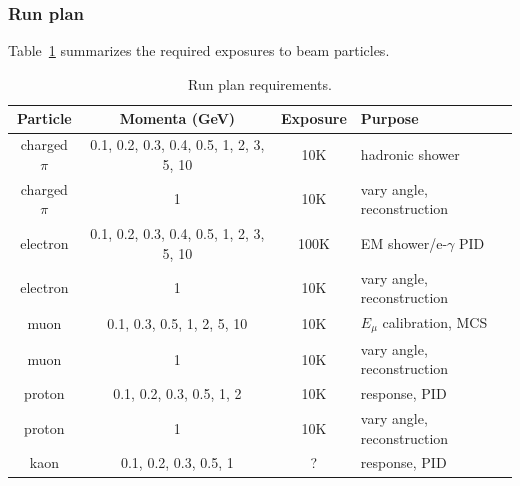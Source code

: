 \clearpage
\subsubsection {Run plan}

Table~\ref{tab:runplan} summarizes the required exposures to beam particles.
\begin{table}[h]
\centering
\begin{tabular}{|c|c|c|l|}
\hline
Particle & Momenta (GeV) & Exposure & Purpose \\ \hline
charged $\pi$       & 0.1, 0.2, 0.3, 0.4, 0.5, 1, 2, 3, 5, 10     &  10K  & hadronic shower \\ \hline
charged $\pi$ &  1  &  10K  & vary angle, reconstruction \\ \hline
electron       &    0.1, 0.2, 0.3, 0.4, 0.5, 1, 2, 3, 5, 10        &    100K   & EM shower/e-$\gamma$ PID     \\ \hline
electron &  1  &  10K  & vary angle, reconstruction \\ \hline
muon &   0.1, 0.3, 0.5, 1, 2, 5, 10  &  10K & $E_\mu$ calibration, MCS \\ \hline
muon &  1  &  10K  & vary angle, reconstruction \\ \hline
proton & 0.1, 0.2, 0.3, 0.5, 1, 2   &  10K & response, PID \\ \hline
proton &  1  &  10K & vary angle, reconstruction \\ \hline
kaon  & 0.1, 0.2, 0.3, 0.5, 1 & ?   &   response, PID  \\ \hline
\end{tabular}
\caption{Run plan requirements.}
\label{tab:runplan}
\end{table}


